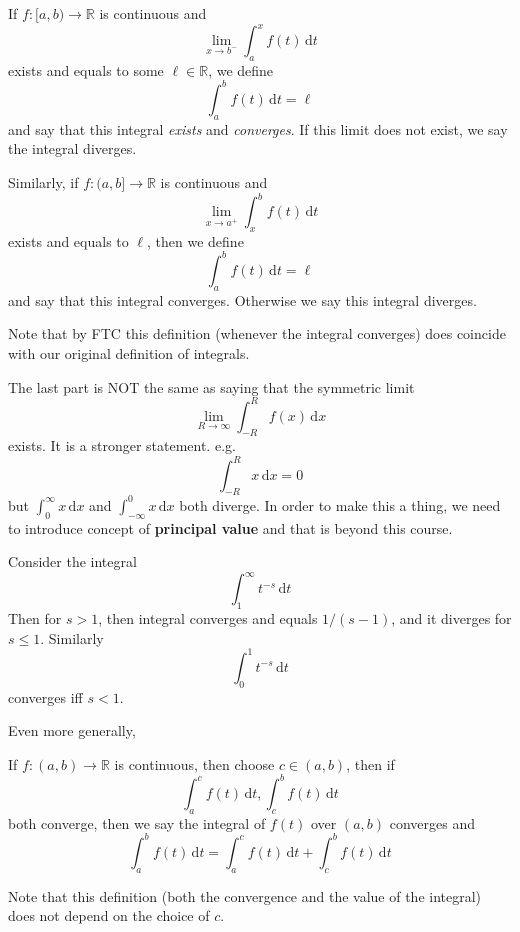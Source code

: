 \begin{definition}
    If $f:[a,b)\to\mathbb R$ is continuous and
    $$\lim_{x\to b^-}\int_a^x f(t)\,\mathrm dt$$
    exists and equals to some $\ell\in\mathbb R$, we define
    $$\int_a^bf(t)\,\mathrm dt=\ell $$
    and say that this integral \textit{exists} and \textit{converges}.
    If this limit does not exist, we say the integral diverges.

    Similarly, if $f:(a,b]\to\mathbb R$ is continuous and
    $$\lim_{x\to a^+}\int_x^bf(t)\,\mathrm dt$$
    exists and equals to $\ell $, then we define
    $$\int_a^bf(t)\,\mathrm dt=\ell $$
    and say that this integral converges.
    Otherwise we say this integral diverges.
\end{definition}
Note that by FTC this definition (whenever the integral converges) does coincide with our original definition of integrals.
\begin{remark}
    The last part is NOT the same as saying that the symmetric limit
    \[
        \lim_{R \to \infty} \int_{-R}^{R} f(x) \,\mathrm{d}x
    \]
    exists. It is a stronger statement. e.g. 
    \[
        \int_{-R}^{R} x \,\mathrm{d}x=0
    \]
    but $ \int_{0}^{\infty} x \,\mathrm{d}x $ and $ \int_{-\infty}^{0} x \,\mathrm{d}x $ both diverge. In order to make this a thing, we need to introduce concept of \textbf{principal value} and that is beyond this course.
\end{remark}

\begin{example}
    Consider the integral
    $$\int_1^\infty t^{-s}\,\mathrm dt$$
    Then for $s>1$, then integral converges and equals $1/(s-1)$, and it diverges for $s\le 1$.
    Similarly
    $$\int_0^1 t^{-s}\,\mathrm dt$$
    converges iff $s<1$.
\end{example}
Even more generally,
\begin{definition}
    If $f:(a,b)\to\mathbb R$ is continuous, then choose $c\in (a,b)$, then if
    $$\int_a^cf(t)\,\mathrm dt,\int_c^bf(t)\,\mathrm dt$$
    both converge, then we say the integral of $f(t)$ over $(a,b)$ converges and
    $$\int_a^bf(t)\,\mathrm dt=\int_a^cf(t)\,\mathrm dt+\int_c^bf(t)\,\mathrm dt$$
\end{definition}
Note that this definition (both the convergence and the value of the integral) does not depend on the choice of $c$.

